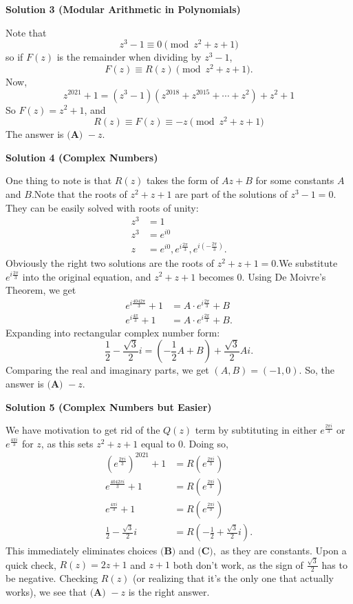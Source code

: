 \begin{enumerate}
\textbf{Solution 3 (Modular Arithmetic in Polynomials)}

Note that
 \[z^3-1\equiv 0\pmod{z^2+z+1}\]so if $F(z)$ is the remainder when dividing by $z^3-1$,
 \[F(z)\equiv R(z)\pmod{z^2+z+1}.\]Now,
 \[z^{2021}+1= (z^3-1)(z^{2018} + z^{2015} + \cdots + z^2) + z^2+1\]So $F(z) = z^2+1$, and
 \[R(z)\equiv F(z) \equiv -z\pmod{z^2+z+1}\]The answer is $\boxed{\textbf{(A) }{-}z}.$




\textbf{Solution 4 (Complex Numbers)}

One thing to note is that $R(z)$ takes the form of $Az + B$ for some constants $A$ and $B.$Note that the roots of $z^2 + z + 1$ are part of the solutions of $z^3 -1 = 0.$They can be easily solved with roots of unity:
 \begin{align*} z^3 &= 1 \\ z^3 &= e^{i 0} \\ z &= e^{i 0}, e^{i \frac{2\pi}{3}}, e^{i\left(-\frac{2\pi}{3}\right)}. \end{align*}
Obviously the right two solutions are the roots of $z^2 + z + 1 = 0.$We substitute $e^{i \frac{2\pi}{3}}$ into the original equation, and $z^2 + z + 1$ becomes $0.$ Using De Moivre's Theorem, we get
 \begin{align*} e^{i\frac{4042\pi}{3}} + 1 &= A \cdot e^{i \frac{2\pi}{3}} + B \\ e^{i\frac{4\pi}{3}} + 1 &= A \cdot e^{i \frac{2\pi}{3}} + B. \end{align*}
Expanding into rectangular complex number form:
 \[\frac{1}{2} - \frac{\sqrt{3}}{2} i = \left(-\frac{1}{2}A + B\right) + \frac{\sqrt{3}}{2} A i.\]Comparing the real and imaginary parts, we get $(A,B) = (-1,0).$ So, the answer is $\boxed{\textbf{(A) }{-}z}.$




\textbf{Solution 5 (Complex Numbers but Easier)}

We have motivation to get rid of the $Q(z)$ term by subtituting in either $e^{\frac{2\pi i}{3}}$ or $e^{\frac{4\pi i}{3}}$ for $z$, as this sets $z^2+z+1$ equal to $0$. Doing so, 
 \begin{align*} \left(e^{\frac{2\pi i}{3}}\right)^{2021} + 1 &= R\left(e^{\frac{2\pi i}{3}}\right) \\ e^{\frac{4042\pi i}{3}} + 1 &= R\left(e^{\frac{2\pi i}{3}}\right) \\ e^{\frac{4\pi i}{3}} + 1 &= R\left(e^{\frac{2\pi i}{3}}\right) \\ \frac{1}{2}-\frac{\sqrt{3}}{2}i &= R\left(-\frac{1}{2} + \frac{\sqrt{3}}{2} i \right). \end{align*}
This immediately eliminates choices $\textbf{(B)}$ and $\textbf{(C)},$ as they are constants. Upon a quick check, $R(z) = 2z+1$ and $z + 1$ both don't work, as the sign of $\frac{\sqrt{3}}{2}$ has to be negative. Checking $R(z)$ (or realizing that it's the only one that actually works), we see that $\boxed{\textbf{(A) }{-}z}$ is the right answer. 


\end{enumerate}
